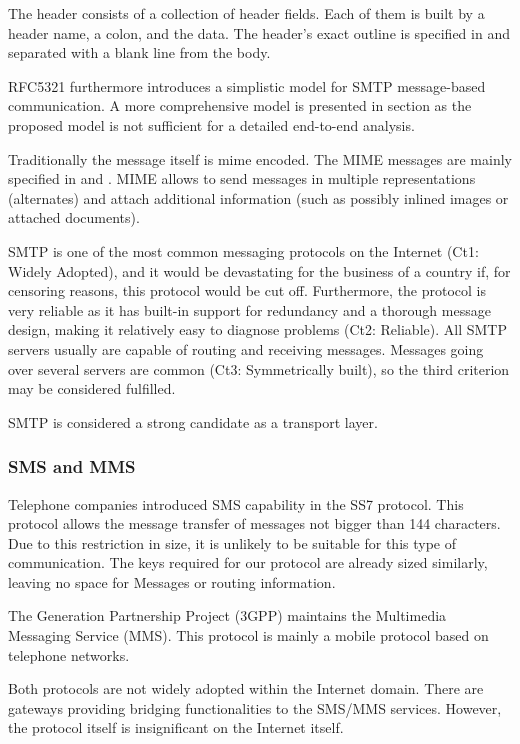The header consists of a collection of header fields. Each of them is built by a header name, a colon, and the data. The header's exact outline is specified in \cite{rfc5322} and separated with a blank line from the body. 

RFC5321\cite{rfc5321} furthermore introduces a simplistic model for SMTP message-based communication. A more comprehensive model is presented in section  as the proposed model is not sufficient for a detailed end-to-end analysis.

Traditionally the message itself is mime encoded. The MIME messages are mainly specified in \cite{rfc2045} and \cite{rfc2046}. MIME allows to send messages in multiple representations (alternates) and attach additional information (such as possibly inlined images or attached documents). 

SMTP is one of the most common messaging protocols on the Internet (Ct1: Widely Adopted), and it would be devastating for the business of a country if, for censoring reasons, this protocol would be cut off. Furthermore, the protocol is very reliable as it has built-in support for redundancy and a thorough message design, making it relatively easy to diagnose problems (Ct2: Reliable). All SMTP servers usually are capable of routing and receiving messages. Messages going over several servers are common (Ct3: Symmetrically built), so the third criterion may be considered fulfilled.

SMTP is considered a strong candidate as a transport layer.  

\subsubsection*{SMS and MMS}
Telephone companies introduced SMS capability in the SS7 protocol. This protocol allows the message transfer of messages not bigger than 144 characters. Due to this restriction in size, it is unlikely to be suitable for this type of communication. The keys required for our protocol are already sized similarly, leaving no space for Messages or routing information.

The  Generation Partnership Project (3GPP) maintains the Multimedia Messaging Service (MMS). This protocol is mainly a mobile protocol based on telephone networks.

Both protocols are not widely adopted within the Internet domain. There are gateways providing bridging functionalities to the SMS/MMS services. However, the protocol itself is insignificant on the Internet itself. 


